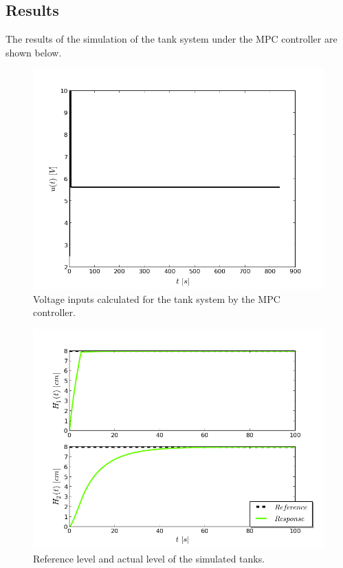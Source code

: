 \subsection{Results}

The results of the simulation of the tank system under the MPC controller are shown below. 

\begin{figure}[H]
\centering
\includegraphics[scale=0.7]{Images/Chapter5/tank_system/control_signal.png}
\caption{Voltage inputs calculated for the tank system by the MPC controller.}
\label{fig:tanks_inputs}
\end{figure}

\begin{figure}[H]
\centeringState
\includegraphics[scale=0.7]{Images/Chapter5/tank_system/levels_control.png}
\caption{Reference level and actual level of the simulated tanks.}
\label{fig:tanks_states}
\end{figure}

